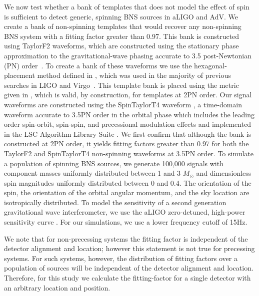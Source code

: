 We now test whether a bank of templates that does not model the effect of spin
is sufficient to detect generic, spinning BNS sources in aLIGO and AdV. We
create a bank of non-spinning templates that would recover any
non-spinning BNS system with a fitting factor greater than 0.97.  This bank is
constructed using TaylorF2 waveforms, which are constructed using the stationary
phase approximation to the gravitational-wave phasing accurate to 3.5
post-Newtonian (PN) order~\cite{DPK99,Blanchet:2006zz}. To create a
bank of these waveforms we use the hexagonal-placement method defined in
\cite{Cokelaer:2007kx}, which was used in the majority of previous searches in
LIGO and Virgo~\cite{Abbott:2009tt,Abbott:2009qj,Abadie:2010yba}. This
template bank is placed using the metric given in \cite{OwenSathyaprakash98},
which is valid, by construction, for templates at 2PN order. 
Our signal waveforms are constructed using the SpinTaylorT4
waveform \cite{BCV03b}, a time-domain waveform accurate to 3.5PN order
in the orbital phase which includes the leading order spin-orbit, spin-spin,
and precessional modulation effects and implemented in the LSC Algorithm Library Suite
\cite{lalsuite}. We first confirm that although the
bank is constructed at 2PN order, it yields fitting factors greater than 0.97
for both the TaylorF2 and SpinTaylorT4 non-spinning waveforms at 3.5PN order.
To simulate a population of spinning BNS sources, we generate 100,000 signals
with component masses uniformly distributed between 1 and 3 $M_{\odot}$ and
dimensionless spin magnitudes uniformly distributed between 0 and 0.4. The orientation
of the spin, the orientation of the orbital angular momentum, and the sky
location are isotropically distributed.  To model the sensitivity of a second
generation gravitational wave interferometer, we use the aLIGO zero-detuned,
high-power sensitivity curve \cite{aLIGOSensCurves}. For our simulations, we
use a lower frequency cutoff of 15Hz.

We note that for non-precessing systems
the fitting factor is independent of the detector alignment and location; however
this statement is not true for precessing systems. For such systems, however,
the distribution of fitting factors over
a population of sources will be independent of the detector alignment
and location. Therefore, for this study we calculate the fitting-factor for a single
detector with an arbitrary location and position.


